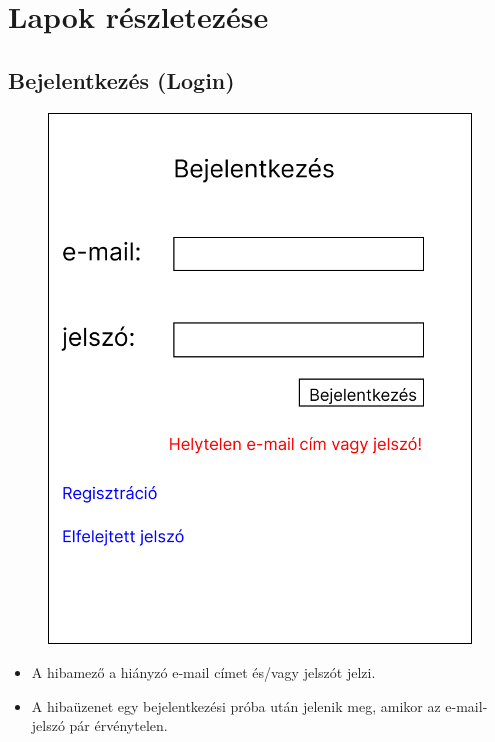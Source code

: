 \documentclass[a4paper,12pt]{article}
\begin{document}
\section{Lapok részletezése}

\subsection{Bejelentkezés (Login)}

\begin{figure}
	\centering
	\includegraphics[width=\textwidth]{images/Web_pages/Login.jpg}
	\caption{}
	\label{fig:Login}
\end{figure}

\begin{itemize}
	\item A hibamező a hiányzó e-mail címet és/vagy jelszót jelzi.
	\item A hibaüzenet egy bejelentkezési próba után jelenik meg, amikor az e-mail-jelszó pár érvénytelen.
\end{itemize}
\end{document}
